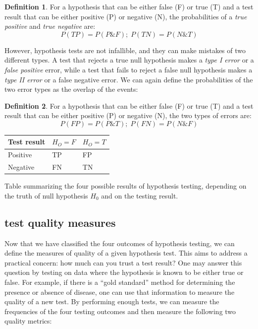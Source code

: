 \documentclass[
]{book}
\theoremstyle{definition}
\newtheorem{definition}{Definition}[chapter]
\theoremstyle{definition}
\theoremstyle{definition}
\theoremstyle{remark}
\begin{document}
\begin{definition}
\protect\hypertarget{def:def-correct-test}{}{\label{def:def-correct-test} }For a hypothesis that can be either false (F) or true (T) and a test result that can be either positive (P) or negative (N), the probabilities of a \emph{true positive} and \emph{true negative} are:
\[ 
P(TP) = P(P \& F); \; P(TN) = P(N \& T)
\]
\end{definition}

However, hypothesis tests are not infallible, and they can make mistakes of two different types. A test that rejects a true null hypothesis makes a \emph{type I error} or a \emph{false positive} error, while a test that fails to reject a false null hypothesis makes a \emph{type II error} or a false negative error. We can again define the probabilities of the two error types as the overlap of the events:

\begin{definition}
\protect\hypertarget{def:def-test-errors}{}{\label{def:def-test-errors} }For a hypothesis that can be either false (F) or true (T) and a test result that can be either positive (P) or negative (N), the two types of errors are:
\[ 
P(FP) = P(P \& T); \; P(FN) = P(N \& F)
\]
\end{definition}

\begin{longtable}[]{@{}lll@{}}
\toprule
Test result & \(H_O = F\) & \(H_O=T\)\tabularnewline
\midrule
\endhead
Positive & TP & FP\tabularnewline
Negative & FN & TN\tabularnewline
\bottomrule
\end{longtable}

Table summarizing the four possible results of hypothesis testing, depending on the truth of null hypothesis \(H_0\) and on the testing result.

\hypertarget{test-quality-measures}{%
\subsection{test quality measures}\label{test-quality-measures}}

Now that we have classified the four outcomes of hypothesis testing, we can define the measures of quality of a given hypothesis test. This aims to address a practical concern: how much can you trust a test result? One may answer this question by testing on data where the hypothesis is known to be either true or false. For example, if there is a ``gold standard'' method for determining the presence or absence of disease, one can use that information to measure the quality of a new test. By performing enough tests, we can measure the frequencies of the four testing outcomes and then measure the following two quality metrics:
\end{document}
